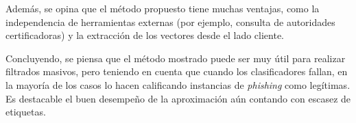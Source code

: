 Además, se opina que el método propuesto tiene muchas ventajas, como la independencia de herramientas externas (por ejemplo, consulta de autoridades certificadoras) y la extracción de los vectores desde el lado cliente.

Concluyendo, se piensa que el método mostrado puede ser muy útil para realizar filtrados masivos, pero teniendo en cuenta que cuando los clasificadores fallan, en la mayoría de los casos lo hacen calificando instancias de \textit{phishing} como legítimas. Es destacable el buen desempeño de la aproximación aún contando con escasez de etiquetas.


